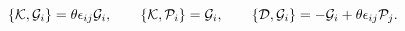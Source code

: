 \begin{equation}
     \{{\cal K},{\cal G}_{i}\}=\theta\epsilon_{ij}{\cal G}_{i},
     \qquad
     \{{\cal K},{\cal P}_{i}\}={\cal G}_{i},
     \qquad
     \{{\cal D},{\cal G}_{i}\}=-{\cal G}_{i}+\theta\epsilon_{ij}{\cal P}_{j}.
     \label{mixed}
\end{equation}

